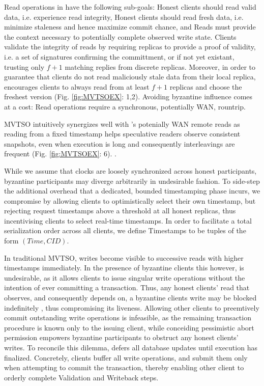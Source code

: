 Read operations in \sys have the following sub-goals: \one Honest clients should read valid data, i.e. experience read integrity, \two Honest clients should read fresh data, i.e. minimize staleness and hence maximize commit chance, and \three Reads must provide the context necessary to potentially complete observed write state. 
Clients validate the integrity of reads by requiring replicas to provide a proof of validity, i.e. a set of signatures confirming the committment, or if not yet existant, trusting  only $f+1$ matching replies from discrete replicas. Moreover, in order to guarantee that clients do not read maliciously stale data from their local replica, \sys encourages clients to always read from at least $f+1$ replicas and choose the freshest version (Fig. \ref{fig:MVTSOEX}: 1,2).
Avoiding byzantine influence comes at a cost: Read operations require a synchronous, potentially WAN, rountrip. 

MVTSO intuitively synergizes well with \sys{}'s potenially WAN remote reads as reading from a fixed timestamp helps speculative readers observe consistent snapshots, even when execution is long and consequently interleavings are frequent (Fig. \ref{fig:MVTSOEX}: 6). .

While we assume that clocks are loosely synchronized across honest participants, byzantine participants may diverge arbitrarily in undesirable fashion. To side-step the additional overhead that a dedicated, bounded timestamping phase \cite{Clairvoyant} incurs, we compromise by allowing clients to optimistically select their own timestamp, but rejecting request timestamps above a threshold at all honest replicas, thus incentivising clients to select real-time timestamps.  In order to facilitate a total serialization order across all clients, we define Timestamps to be tuples of the form $(Time, CID)$. 


In traditional MVTSO, writes become visible to successive reads with higher timestamps immediately. In the presence of byzantine clients this however, is undesirable, as it allows clients to issue singular write operations without the intention of ever committing a transaction. Thus, any honest clients' read that observes, and consequently depends on, a byzantine clients write may be blocked indefinitely , thus compromising its liveness.
Allowing other clients to preemtively commit outstanding write operations is infeasible, as the remaining transaction procedure is known only to the issuing client, while conceiding pessimistic abort permission empowers byzantine participants to obstruct any honest clients' writes. 
To reconcile this dilemma, \sys{} defers all database updates until execution has finalized.  Concretely, \sys clients buffer all write operations, and submit them only when attempting to commit the transaction, thereby enabling other \sys client to orderly complete Validation and Writeback steps. 


